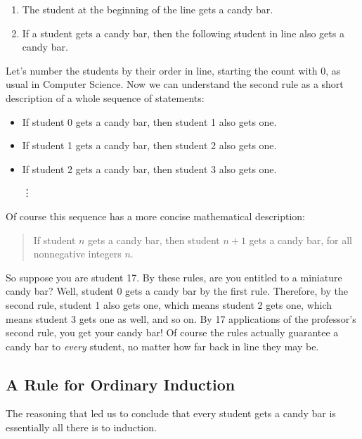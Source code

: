 \begin{enumerate}
\item The student at the beginning of the line gets a candy bar.
\item If a student gets a candy bar, then the following student in line
  also gets a candy bar.
\end{enumerate}
%
Let's number the students by their order in line, starting the count with
0, as usual in Computer Science.  Now we can understand the second rule as
a short description of a whole sequence of statements:
%
\begin{itemize}
\item If student 0 gets a candy bar, then student 1 also gets one.
\item If student 1 gets a candy bar, then student 2 also gets one.
\item If student 2 gets a candy bar, then student 3 also gets one.

\hspace{1.2in} \vdots
\end{itemize}
%
Of course this sequence has a more concise mathematical description:
\begin{quote}
  If student $n$ gets a candy bar, then student $n+1$ gets a
  candy bar, for all nonnegative integers $n$.
\end{quote}
So suppose you are student 17.  By these rules, are you entitled to a
miniature candy bar?  Well, student 0 gets a candy bar by the first rule.
Therefore, by the second rule, student 1 also gets one, which means
student 2 gets one, which means student 3 gets one as well, and so on.  By
17 applications of the professor's second rule, you get your candy bar!
Of course the rules actually guarantee a candy bar to \emph{every}
student, no matter how far back in line they may be.


\subsection{A Rule for Ordinary Induction}

The reasoning that led us to conclude that every student gets a candy bar is 
essentially all there is to induction.

